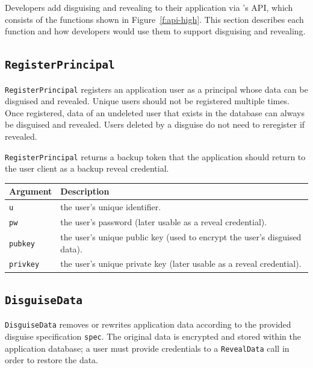 Developers add disguising and revealing to their application via \sys's API,
which consists of the functions shown in Figure~\ref{f:api-high}. This section
describes each function and how developers would use them to support disguising
and revealing.

\subsection{\texttt{RegisterPrincipal}}
    \texttt{RegisterPrincipal} registers an application user as a principal whose data can be disguised and
    revealed. Unique users should not be registered multiple times. Once
    registered, data of an undeleted user that exists in the database can always
    be disguised and revealed.  Users deleted by a disguise do not need to
    reregister if revealed.

    \texttt{RegisterPrincipal} returns a backup token that the application should return to
    the user client as a backup reveal credential.

    \begin{center}
    \begin{longtable}{|m{}|m{}|}
        \hline
        \textbf{Argument} & \textbf{Description} \\
        \hline
        \texttt{u} & the user's unique identifier.\\
        \hline
        \texttt{pw} & the user's password (later usable as a reveal credential).\\
        \hline
        \texttt{pubkey} & the user's unique public key (used to encrypt the
        user's disguised data).\\
        \hline
        \texttt{privkey} & the user's unique private key (later usable as a reveal
        credential).\\
        \hline
    \end{longtable}
    \end{center}

\subsection{\texttt{DisguiseData}}
    \texttt{DisguiseData} removes or rewrites application data according to
    the provided disguise specification \texttt{spec}. The original data
    is encrypted and stored within the application database; a user must provide
    credentials to a \texttt{RevealData} call in order to restore the data.

